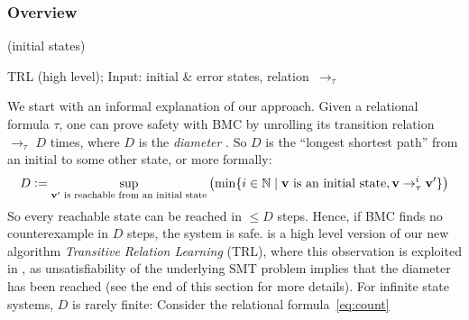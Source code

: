 \subsubsection{Overview}

\paper{\vspace*{-.3cm}}

\begin{algorithm}[t]
  \encode(initial states)\;
  \caption{TRL (high level); Input: initial \& error states, relation~$\to_\tau$}
  \label{alg:overview}
  \end{algorithm} 
%
We start with an informal explanation of our approach.
%
Given a relational formula $\tau$, one can prove safety with BMC by unrolling its transition relation $\to_\tau$
$D$ times, where $D$ is the \emph{diameter} \cite{bmc2}.
%
So $D$ is the ``longest shortest path'' from an initial to some other state, or more formally:
\[
  D \mathrel{\mathop:}= \sup_{\bm{\mathrm{v}}' \text{ is reachable from an initial state}} \left( \min \{i \in \mathbb{N} \mid \bm{\mathrm{v}} \text{ is an initial state}, \bm{\mathrm{v}} \to_\tau^i \bm{\mathrm{v}}' \}\right)
\]
%
So every reachable state can be reached in $\leq D$ steps.
%
Hence, if BMC finds no counterexample in $D$ steps, the system is safe.
%
 is a high level version of our new algorithm \emph{Transitive Relation Learning} (TRL),
where this observation is exploited in , as unsatisfiability of the underlying SMT problem implies that the diameter has been reached (see the end of this section for more details).
%
For infinite state systems, $D$ is rarely finite:
%
Consider the relational formula~\eqref{eq:count}



